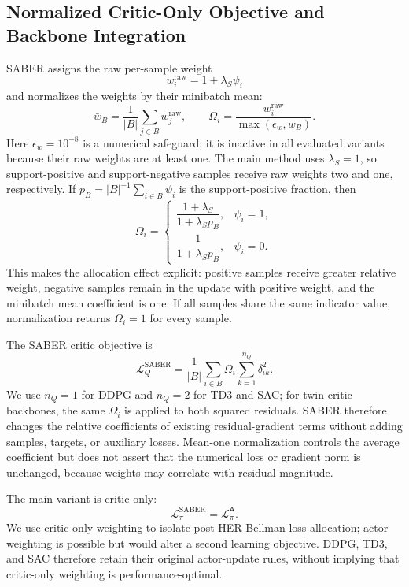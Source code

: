 \documentclass[letterpaper]{article}
\begin{document}
\subsection{Normalized Critic-Only Objective and Backbone Integration}

SABER assigns the raw per-sample weight
\begin{equation}
w_i^{\mathrm{raw}}=1+\lambda_S\psi_i
\end{equation}
and normalizes the weights by their minibatch mean:
\begin{equation}
\bar w_B=
\frac{1}{|B|}\sum_{j\in B}w_j^{\mathrm{raw}},
\qquad
\Omega_i=
\frac{w_i^{\mathrm{raw}}}
{\max(\epsilon_w,\bar w_B)}.
\end{equation}
Here \(\epsilon_w=10^{-8}\) is a numerical safeguard; it is
inactive in all evaluated variants because their raw weights are at
least one.
The main method uses \(\lambda_S=1\), so support-positive and
support-negative samples receive raw weights two and one,
respectively.  If
\(p_B=|B|^{-1}\sum_{i\in B}\psi_i\) is the support-positive fraction,
then
\begin{equation}
\Omega_i=
\begin{cases}
\dfrac{1+\lambda_S}{1+\lambda_S p_B},
& \psi_i=1,\\[2mm]
\dfrac{1}{1+\lambda_S p_B},
& \psi_i=0.
\end{cases}
\end{equation}
This makes the allocation effect explicit: positive samples receive
greater relative weight, negative samples remain in the update with
positive weight, and the minibatch mean coefficient is one.  If all
samples share the same indicator value, normalization returns
\(\Omega_i=1\) for every sample.

The SABER critic objective is
\begin{equation}
\mathcal L_Q^{\mathrm{SABER}}
=\frac{1}{|B|}
\sum_{i\in B}\Omega_i
\sum_{k=1}^{n_Q}\delta_{ik}^{2}.
\end{equation}
We use \(n_Q=1\) for DDPG and \(n_Q=2\) for TD3 and SAC; for twin-critic
backbones, the same \(\Omega_i\) is applied to both squared residuals.
SABER therefore changes the relative coefficients of existing
residual-gradient terms without adding samples, targets, or auxiliary
losses.  Mean-one normalization controls the average coefficient but
does not assert that the numerical loss or gradient norm is unchanged,
because weights may correlate with residual magnitude.

The main variant is critic-only:
\begin{equation}
\mathcal L_\pi^{\mathrm{SABER}}
=\mathcal L_\pi^{\mathsf A}.
\end{equation}
We use critic-only weighting to isolate post-HER Bellman-loss
allocation; actor weighting is possible but would alter a second
learning objective. DDPG, TD3, and SAC therefore retain their original
actor-update rules, without implying that critic-only weighting is
performance-optimal.
\end{document}
